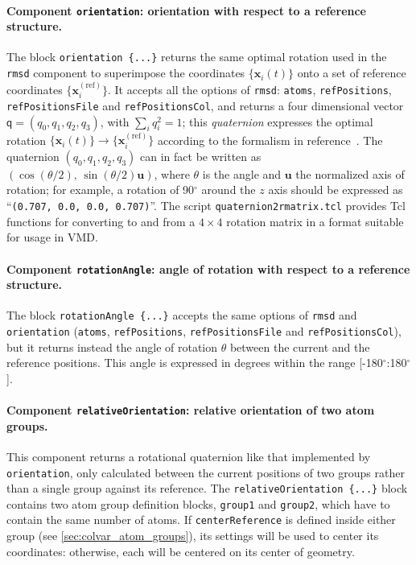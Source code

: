 \paragraph*{Component \texttt{orientation}: orientation with respect
  to a reference structure.}  The block \texttt{orientation~\{...\}}
returns the same optimal rotation used in the \texttt{rmsd} component
to superimpose the coordinates $\{\mathbf{x}_i(t)\}$ onto a set of
reference coordinates $\{\mathbf{x}_i^{\mathrm{(ref)}}\}$.  It accepts
all the options of \texttt{rmsd}: \texttt{atoms},
\texttt{refPositions}, \texttt{refPositionsFile} and
\texttt{refPositionsCol}, and returns a four dimensional vector
$\mathsf{q} = (q_0, q_1, q_2, q_3)$, with $\sum_i q_i^2 = 1$; this
\emph{quaternion} expresses the optimal rotation $\{\mathbf{x}_i(t)\}
\rightarrow \{\mathbf{x}_i^{\mathrm{(ref)}}\}$ according to the
formalism in reference~\cite{Coutsias2004}.  The quaternion $(q_0,
q_1, q_2, q_3)$ can in fact be written as $\left(\cos(\theta/2), \,
  \sin(\theta/2)\mathbf{u}\right)$, where $\theta$ is the angle and
$\mathbf{u}$ the normalized axis of rotation; for example, a rotation
of 90$^{\circ}$ around the $z$ axis should be expressed as
``\texttt{(0.707, 0.0, 0.0, 0.707)}''.  The script
\texttt{quaternion2rmatrix.tcl} provides Tcl functions for converting
to and from a $4\times{}4$ rotation matrix in a format suitable for
usage in VMD.


\paragraph*{Component \texttt{rotationAngle}: angle of rotation with
  respect to a reference structure.}  The block
\texttt{rotationAngle~\{...\}} accepts the same options of
\texttt{rmsd} and \texttt{orientation} (\texttt{atoms},
\texttt{refPositions}, \texttt{refPositionsFile} and
\texttt{refPositionsCol}), but it returns instead the angle of
rotation $\theta$ between the current and the reference positions.
This angle is expressed in degrees within the range
[-180$^{\circ}$:180$^{\circ}$].



\paragraph*{Component \texttt{relativeOrientation}: relative
  orientation of two atom groups.}  This component returns a
rotational quaternion like that implemented by \texttt{orientation},
only calculated between the current positions of two groups rather
than a single group against its reference.  The
\texttt{relativeOrientation~\{...\}} block contains two atom group
definition blocks, \texttt{group1} and \texttt{group2}, which have to
contain the same number of atoms.  If \texttt{centerReference} is
defined inside either group (see \ref{sec:colvar_atom_groups}), its
settings will be used to center its coordinates: otherwise, each will
be centered on its center of geometry.

